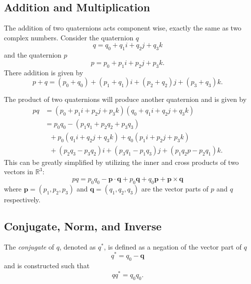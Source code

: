 \subsection{Addition and Multiplication}
The addition of two quaternions acts component wise, exactly the same as two complex numbers.
Consider the quaternion $q$
\begin{equation}
q = q_0 + q_1\textit{i} + q_2\textit{j} + q_3\textit{k}
\label{eq:q}
\end{equation}
and the quaternion $p$
\begin{equation}
p = p_0 + p_1\textit{i} + p_2\textit{j} + p_3\textit{k}.
\label{eq:p}
\end{equation}
There addition is given by
\begin{equation}
p + q = (p_0+q_0) + (p_1+q_1)\textit{i} + (p_2+q_2)\textit{j} + (p_3+q_3)\textit{k}.
\label{eq:quataddition}
\end{equation}

The product of two quaternions will produce another quaternion and is given by
\begin{align*}
pq &= (p_0 + p_1\textit{i} + p_2\textit{j} + p_3\textit{k})(q_0 + q_1\textit{i} + q_2\textit{j} + q_3\textit{k}) \nonumber \\
&= p_0q_0 - (p_1q_1 + p_2q_2 + p_3q_3) \nonumber \\
&~~~ + p_0(q_1\textit{i} + q_2\textit{j} + q_3\textit{k}) + q_0(p_1\textit{i} + p_2\textit{j} + p_3\textit{k}) \nonumber \\
&~~~ + (p_2q_3 - p_3q_2)\textit{i} + (p_3q_1 - p_1q_3)\textit{j} + (p_1q_2p - p_2q_1)\textit{k}. \nonumber
\end{align*}
This can be greatly simplified by utilizing the inner and cross products of two vectors in $\mathbb{R}^3$:
\begin{equation}
pq = p_0q_0 - \textbf{p}\cdot\textbf{q} + p_0\textbf{q} + q_0\textbf{p} + \textbf{p} \times \textbf{q}
\label{eq:quatmult}
\end{equation}
where $\textbf{p} = (p_1,p_2,p_3)$ and $\textbf{q} = (q_1,q_2,q_3)$ are the vector parts of $p$ and $q$ respectively.


\subsection{Conjugate, Norm, and Inverse}
The \textit{conjugate} of $q$, denoted as $q^*$, is defined as a negation of the vector part of $q$
\begin{equation}
q^* = q_0 - \textbf{q}
\label{eq:quatconjugate}
\end{equation}
and is constructed such that
\begin{equation*}
qq^* = q_0q_0.
\end{equation*}

